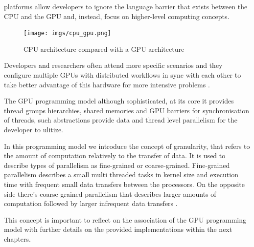 \documentclass[
  oneside,
  11pt, a4paper,
  footinclude=true,
  headinclude=true,
  cleardoublepage=empty
]{scrbook}
\begin{document}
platforms allow developers to ignore the language barrier that exists between the CPU and the GPU and, instead, focus on higher-level computing concepts.

\begin{figure}[h]
    \centering
    \texttt{[image: imgs/cpu\_gpu.png]}
    \caption{CPU architecture compared with a GPU architecture}
    \label{fig:cpu-gpu}
\end{figure}

Developers and researchers often attend more specific scenarios and they configure multiple GPUs with distributed workflows in sync with each other to take better advantage of this hardware for more intensive problems \cite{heldens2022lightning}.

The GPU programming model although sophisticated, at its core it provides thread groups hierarchies, shared memories and GPU barriers for synchronisation of threads, such abstractions provide data and thread level parallelism for the developer to ulitize. \newline

In this programming model we introduce the concept of granularity, that refers to the amount of computation relatively to the transfer of data. It is used to describe types of parallelism as fine-grained or coarse-grained. 
Fine-grained parallelism describes a small multi threaded tasks in kernel size and execution time with frequent small data transfers between the processors. On the opposite side there's coarse-grained parallelism that describes larger amounts of computation followed by larger infrequent data transfers \cite{CUDAcppguide}.


This concept is important to reflect on the association of the GPU programming model with further details on the provided implementations within the next chapters. \newline
\end{document}

